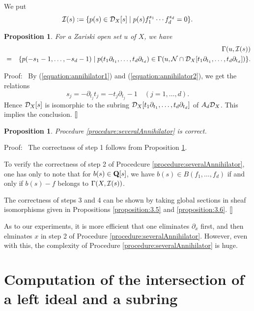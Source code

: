 \documentclass[12pt]{article}
\def\Q{{\bf Q}}
\def\Dsc{ {\cal D} }
\def\Isc{ {\cal I} }
\def\Nsc{ {\cal N} }
\newenvironment{proof}{\par\noindent Proof:\ }{${\tt [}\kern-0.2mm{\tt ]}$}
\newtheorem{proposition}[theorem]{Proposition}
\begin{document}
We put
$$
\Isc(s) := \{ p(s) \in \Dsc_X[s] \mid
p(s)f_1^{s_1}\cdots f_d^{s_d} = 0\}.
$$

\begin{proposition} \label{proposition:severalAnnihilator}
For a Zariski open set $u$ of $X$, we have
\begin{eqnarray*}
& & \Gamma(u,\Isc(s)) \\
&=& \{p(-s_1-1,\dots,-s_d-1) \mid 
p(t_1\partial_{t_1},\dots,t_d\partial_{t_d}) \in 
\Gamma(u, \Nsc\cap\Dsc_X[t_1\partial_{t_1},\dots,t_d\partial_{t_d}]) \}.
\end{eqnarray*}
\end{proposition}

\begin{proof}
By (\ref{equation:annihilator1}) and 
(\ref{equation:annihilator2}), we get the relations
$$
s_j = -\partial_{t_j}t_j = -t_j\partial_{t_j}-1
\quad (j=1,\dots,d).
$$
Hence $\Dsc_X[s]$ is isomorphic to the subring
$\Dsc_X[t_1\partial_{t_1},\dots,t_d\partial_{t_d}]$ of $A_d\Dsc_X$.
This implies the conclusion.
\end{proof}

\begin{proposition}
\label{proposition:3.10}
Procedure
\ref{procedure:severalAnnihilator} is correct.
\end{proposition}

\begin{proof}
The correctness of step 1 follows from Proposition 
\ref{proposition:severalAnnihilator}.

To verify the correctness of step 2 of Procedcure
\ref{procedure:severalAnnihilator},
one has only to note that for $b(s) \in \Q[s]$, we have
$b(s)\in B(f_1,\dots,f_d)$ if and only if 
$b(s)-f$ belongs to $\Gamma(X,\Isc(s))$.

The correctness of steps 3 and 4 can be shown 
by taking global sections in sheaf isomorphisms given
in Propositions \ref{proposition:3.5} and \ref{proposition:3.6}.
\end{proof}


As to our experiments, it is more efficient that one eliminates 
$\partial_x$ first, and then elminates $x$ in step 2 of 
Procedure \ref{procedure:severalAnnihilator}.
However, even with this, the complexity of Procedure 
\ref{procedure:severalAnnihilator} is huge.


\section{Computation of the intersection of a left ideal and a subring}
\setcounter{equation}{0}
\label{section:intersection}
\end{document}
